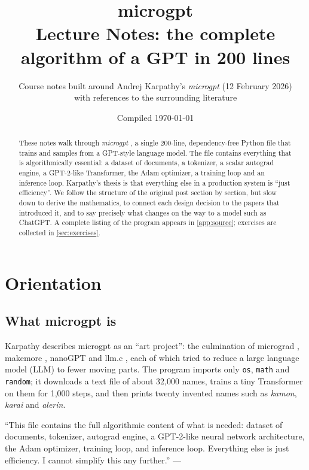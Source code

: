 \documentclass[11pt,letterpaper]{article}
\title{\vspace{-1.5em}\textbf{microgpt}\\[0.3em]
       \Large Lecture Notes: the complete algorithm of a GPT in 200 lines}
\author{Course notes built around Andrej Karpathy's \emph{microgpt} (12 February 2026)\\
        \small with references to the surrounding literature}
\date{Compiled \today}
\theoremstyle{remark}
\newcommand{\code}[1]{\lstinline[basicstyle=\ttfamily\small]|#1|}
\begin{document}
\maketitle

\begin{abstract}
\noindent
These notes walk through \emph{microgpt} \parencite{karpathy2026microgpt,karpathy2026microgptgist}, a single 200-line, dependency-free Python file that trains and samples from a GPT-style language model.
The file contains everything that is algorithmically essential: a dataset of documents, a tokenizer, a scalar autograd engine, a GPT-2-like Transformer, the Adam optimizer, a training loop and an inference loop.
Karpathy's thesis is that everything else in a production system is ``just efficiency''.
We follow the structure of the original post section by section, but slow down to derive the mathematics, to connect each design decision to the papers that introduced it, and to say precisely what changes on the way to a model such as ChatGPT.
A complete listing of the program appears in \cref{app:source}; exercises are collected in \cref{sec:exercises}.
\end{abstract}

\tableofcontents
\clearpage

\section{Orientation}

\subsection{What microgpt is}

Karpathy describes microgpt as an ``art project'': the culmination of micrograd \parencite{karpathy2020micrograd}, makemore \parencite{karpathy2022makemore}, nanoGPT \parencite{karpathy2022nanogpt} and llm.c \parencite{karpathy2024llmc}, each of which tried to reduce a large language model (LLM) to fewer moving parts.
The program imports only \code{os}, \code{math} and \code{random}; it downloads a text file of about 32{,}000 names, trains a tiny Transformer on them for 1{,}000 steps, and then prints twenty invented names such as \emph{kamon}, \emph{karai} and \emph{alerin}.

\begin{quotebox}
``This file contains the full algorithmic content of what is needed: dataset of documents, tokenizer, autograd engine, a GPT-2-like neural network architecture, the Adam optimizer, training loop, and inference loop. Everything else is just efficiency. I cannot simplify this any further.'' \hfill --- \textcite{karpathy2026microgpt}
\end{quotebox}
\end{document}
